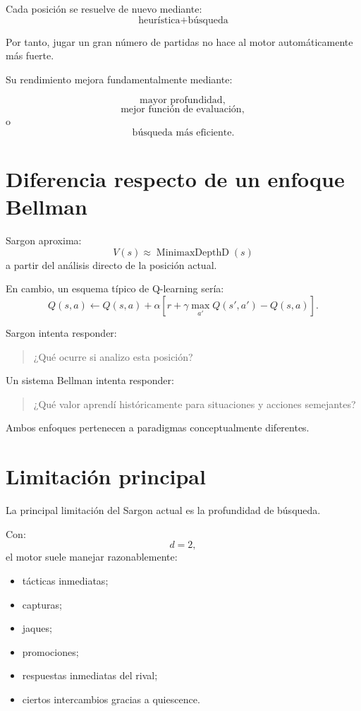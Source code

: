 \documentclass[11pt,a4paper]{article}
\begin{document}
Cada posición se resuelve de nuevo mediante:
\[
\boxed{
\text{heurística}
+
\text{búsqueda}
}
\]

Por tanto, jugar un gran número de partidas no hace al motor automáticamente más
fuerte.

Su rendimiento mejora fundamentalmente mediante:

\[
\text{mayor profundidad},
\]
\[
\text{mejor función de evaluación},
\]
o
\[
\text{búsqueda más eficiente}.
\]

\section{Diferencia respecto de un enfoque Bellman}

Sargon aproxima:
\[
V(s)\approx
\operatorname{MinimaxDepthD}(s)
\]
a partir del análisis directo de la posición actual.

En cambio, un esquema típico de Q-learning sería:
\[
Q(s,a)
\leftarrow
Q(s,a)
+
\alpha
\left[
r+
\gamma\max_{a'}Q(s',a')
-
Q(s,a)
\right].
\]

Sargon intenta responder:
\begin{quote}
¿Qué ocurre si analizo esta posición?
\end{quote}

Un sistema Bellman intenta responder:
\begin{quote}
¿Qué valor aprendí históricamente para situaciones y acciones semejantes?
\end{quote}

Ambos enfoques pertenecen a paradigmas conceptualmente diferentes.

\section{Limitación principal}

La principal limitación del Sargon actual es la profundidad de búsqueda.

Con:
\[
d=2,
\]
el motor suele manejar razonablemente:

\begin{itemize}
    \item tácticas inmediatas;
    \item capturas;
    \item jaques;
    \item promociones;
    \item respuestas inmediatas del rival;
    \item ciertos intercambios gracias a quiescence.
\end{itemize}
\end{document}
